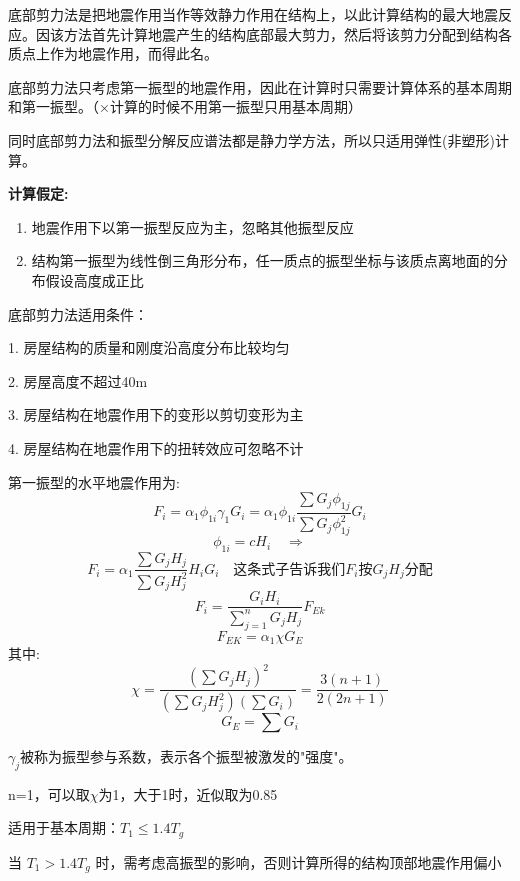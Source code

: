 \documentclass[12pt, a4paper, oneside, UTF8]{ctexbook}
\begin{document}
底部剪力法是把地震作用当作等效静力作用在结构上，以此计算结构的最大地震反应。因该方法首先计算地震产生的结构底部最大剪力，然后将该剪力分配到结构各质点上作为地震作用，而得此名。

\begin{remark}
    底部剪力法只考虑第一振型的地震作用，因此在计算时只需要计算体系的基本周期和第一振型。（×计算的时候不用第一振型只用基本周期）

    同时底部剪力法和振型分解反应谱法都是静力学方法，所以只适用弹性(非塑形)计算。
\end{remark}

\textbf{计算假定:}

\begin{enumerate}
    \item 地震作用下以第一振型反应为主，忽略其他振型反应

    \item 结构第一振型为线性倒三角形分布，任一质点的振型坐标与该质点离地面的分布假设高度成正比
\end{enumerate}

底部剪力法适用条件：

1. 房屋结构的质量和刚度沿高度分布比较均匀

2. 房屋高度不超过40m

3. 房屋结构在地震作用下的变形以剪切变形为主

4. 房屋结构在地震作用下的扭转效应可忽略不计

\begin{theorem}
    第一振型的水平地震作用为:
\[F_i = \alpha_1 \phi_{1i} \gamma_1 G_i = \alpha_1 \phi_{1i} \frac{\sum G_j \phi_{1j}}{\sum G_j \phi_{1j}^2} G_i\]
\[
\phi_{1i} = cH_i \quad \Longrightarrow
\]
\[
F_i = \alpha_1 \frac{\sum G_j H_j}{\sum G_j H_j^2} H_i G_i \quad \text{这条式子告诉我们}F_i\text{按}G_j H_j\text{分配}
\]
\[
F_i = \frac{G_i H_i}{\sum_{j=1}^{n} G_j H_j} F_{Ek}
\]
\[ F_{EK} = \alpha_1 \chi G_E \]
其中:
\[ \chi = \frac{(\sum G_j H_j)^2}{(\sum G_j H_j^2)(\sum G_i)} =\frac{3(n+1)}{2(2n+1)}\]
\[ G_E = \sum G_i \]

\end{theorem}

\begin{remark}
    $\gamma_j$被称为振型参与系数，表示各个振型被激发的"强度"。

    n=1，可以取$\chi$为1，大于1时，近似取为0.85
\end{remark}

\begin{remark}
    适用于基本周期：\( T_1 \leq 1.4T_g \)

当 \( T_1 > 1.4T_g \) 时，需考虑高振型的影响，否则计算所得的结构顶部地震作用偏小
\end{remark}
\end{document}
